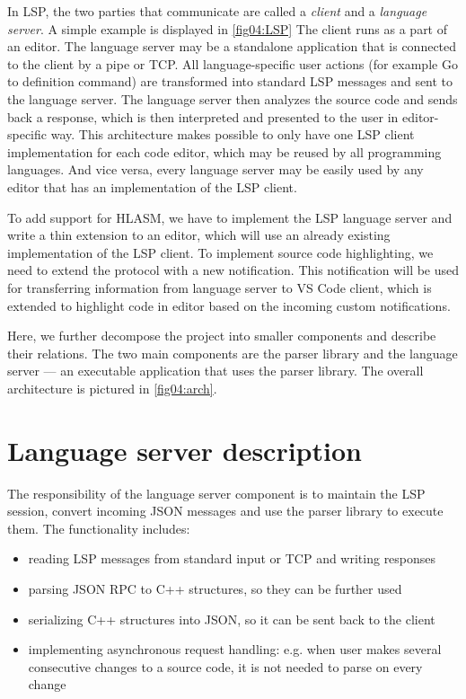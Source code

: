In LSP, the two parties that communicate are called a \emph{client} and a \emph{language server}. A simple example is displayed in \cref{fig04:LSP} The client runs as a part of an editor. The language server may be a standalone application that is connected to the client by a pipe or TCP. All language-specific user actions (for example Go to definition command) are transformed into standard LSP messages and sent to the language server. The language server then analyzes the source code and sends back a response, which is then interpreted and presented to the user in editor-specific way. This architecture makes possible to only have one LSP client implementation for each code editor, which may be reused by all programming languages. And vice versa, every language server may be easily used by any editor that has an implementation of the LSP client.

To add support for HLASM, we have to implement the LSP language server and write a thin extension to an editor, which will use an already existing implementation of the LSP client. To implement source code highlighting, we need to extend the protocol with a new notification. This notification will be used for transferring information from language server to VS Code client, which is extended to highlight code in editor based on the incoming custom notifications.

Here, we further decompose the project into smaller components and describe their relations. The two main components are the parser library and the language server --- an executable application that uses the parser library. The overall architecture is pictured in \cref{fig04:arch}.

\section{Language server description}

The responsibility of the language server component is to maintain the LSP session, convert incoming JSON messages and use the parser library to execute them. The functionality includes:
\begin{itemize}
    \item reading LSP messages from standard input or TCP and writing responses
    \item parsing JSON RPC to C++ structures, so they can be further used
    \item serializing C++ structures into JSON, so it can be sent back to the client
    \item implementing asynchronous request handling: e.g. when user makes several consecutive changes to a source code, it is not needed to parse on every change
\end{itemize}

